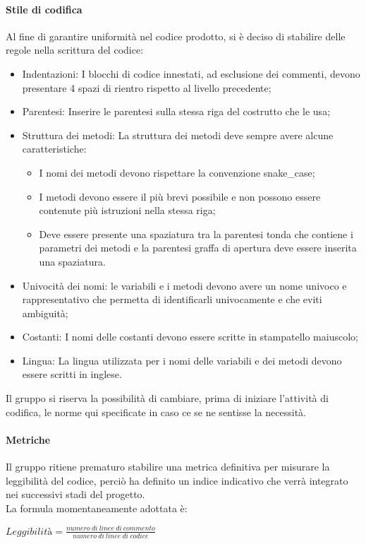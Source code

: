 \documentclass[../norme_di_progetto.tex]{subfiles}
\begin{document}
 
 \paragraph{Stile di codifica}
 Al fine di garantire uniformità nel codice prodotto, si è deciso di stabilire delle regole nella scrittura del codice:
 \begin{itemize}
     \item Indentazioni: I blocchi di codice innestati, ad esclusione dei commenti, devono presentare 4 spazi di rientro rispetto al livello precedente;
     \item Parentesi: Inserire le parentesi sulla stessa riga del costrutto che le usa;
     \item Struttura dei metodi: La struttura dei metodi deve sempre avere alcune caratteristiche:
     \begin{itemize}
         \item I nomi dei metodi devono rispettare la convenzione snake\_case;
         \item I metodi devono essere il più brevi possibile e non possono essere contenute più istruzioni nella stessa riga;
         \item Deve essere presente una spaziatura tra la parentesi tonda che contiene i parametri dei metodi e la parentesi graffa di apertura deve essere inserita una spaziatura.
     \end{itemize}
     \item Univocità dei nomi: le variabili e i metodi devono avere un nome univoco e rappresentativo che permetta di identificarli univocamente e che eviti ambiguità;
     \item Costanti: I nomi delle costanti devono essere scritte in stampatello maiuscolo;
     \item Lingua: La lingua utilizzata per i nomi delle variabili e dei metodi devono essere scritti in inglese.
 \end{itemize}
 Il gruppo si riserva la possibilità di cambiare, prima di iniziare l'attività di codifica, le norme qui specificate in caso ce se ne sentisse la necessità.
 
 \paragraph{Metriche}
  Il gruppo ritiene prematuro stabilire una metrica definitiva per misurare la leggibilità del codice, perciò ha definito un indice indicativo che verrà integrato nei successivi stadi del progetto.\\
  La formula momentaneamente adottata è:
  \begin{center}
      $Leggibilità = \frac{numero\ di\ linee\ di\ commento}{numero\ di\ linee\ di\ codice}$
  \end{center}
 
\end{document}
